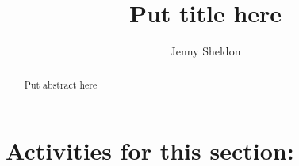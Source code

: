 \documentclass{ximera}
\title{Put title here}
\author{Jenny Sheldon}
\begin{document}
\begin{abstract}
Put abstract here
\end{abstract}
\maketitle

\section{Activities for this section:} 
\end{document}
